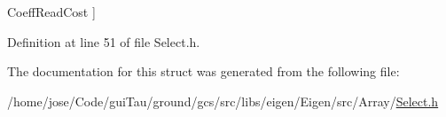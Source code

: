 \begin{Desc}
\begin{description}
{\hypertarget{structei__traits_3_01_select_3_01_condition_matrix_type_00_01_then_matrix_type_00_01_else_matrix_type_01_4_01_4_ad47d71b728e8f53706df432a3b25ff74ad7a1c411607f780af9054555dcbf7b2b}{Coeff\-Read\-Cost}\label{structei__traits_3_01_select_3_01_condition_matrix_type_00_01_then_matrix_type_00_01_else_matrix_type_01_4_01_4_ad47d71b728e8f53706df432a3b25ff74ad7a1c411607f780af9054555dcbf7b2b}
}]\end{description}
\end{Desc}


Definition at line 51 of file Select.\-h.



The documentation for this struct was generated from the following file\-:\begin{DoxyCompactItemize}
\item 
/home/jose/\-Code/gui\-Tau/ground/gcs/src/libs/eigen/\-Eigen/src/\-Array/\hyperlink{_select_8h}{Select.\-h}\end{DoxyCompactItemize}
